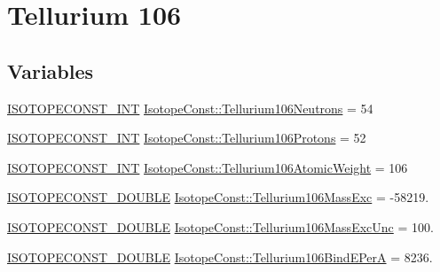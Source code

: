 \hypertarget{group___isotope_const-_tellurium-_te106}{}\section{Tellurium 106}
\label{group___isotope_const-_tellurium-_te106}
\subsection*{Variables}
\begin{DoxyCompactItemize}
\item 
\mbox{\hyperlink{group___isotope_const-_macros_ga5f18360b3e99483a35c32d789e62621c}{I\+S\+O\+T\+O\+P\+E\+C\+O\+N\+S\+T\+\_\+\+I\+NT}} \mbox{\hyperlink{group___isotope_const-_tellurium-_te106_ga340d9bd1e86735c63dcff05eab936361}{Isotope\+Const\+::\+Tellurium106\+Neutrons}} = 54
\item 
\mbox{\hyperlink{group___isotope_const-_macros_ga5f18360b3e99483a35c32d789e62621c}{I\+S\+O\+T\+O\+P\+E\+C\+O\+N\+S\+T\+\_\+\+I\+NT}} \mbox{\hyperlink{group___isotope_const-_tellurium-_te106_gac56c59e9ccc4700f73ad10e5878fe7df}{Isotope\+Const\+::\+Tellurium106\+Protons}} = 52
\item 
\mbox{\hyperlink{group___isotope_const-_macros_ga5f18360b3e99483a35c32d789e62621c}{I\+S\+O\+T\+O\+P\+E\+C\+O\+N\+S\+T\+\_\+\+I\+NT}} \mbox{\hyperlink{group___isotope_const-_tellurium-_te106_ga740865286a13a7ce8c84a46ae1623670}{Isotope\+Const\+::\+Tellurium106\+Atomic\+Weight}} = 106
\item 
\mbox{\hyperlink{group___isotope_const-_macros_ga8f45a7272ce02c0b4c65c44636ed719a}{I\+S\+O\+T\+O\+P\+E\+C\+O\+N\+S\+T\+\_\+\+D\+O\+U\+B\+LE}} \mbox{\hyperlink{group___isotope_const-_tellurium-_te106_gaa2be6aefe1805423473bbc9247507ad5}{Isotope\+Const\+::\+Tellurium106\+Mass\+Exc}} = -\/58219.
\item 
\mbox{\hyperlink{group___isotope_const-_macros_ga8f45a7272ce02c0b4c65c44636ed719a}{I\+S\+O\+T\+O\+P\+E\+C\+O\+N\+S\+T\+\_\+\+D\+O\+U\+B\+LE}} \mbox{\hyperlink{group___isotope_const-_tellurium-_te106_ga1a417dbf61d7e17dea8496dfd1f48153}{Isotope\+Const\+::\+Tellurium106\+Mass\+Exc\+Unc}} = 100.
\item 
\mbox{\hyperlink{group___isotope_const-_macros_ga8f45a7272ce02c0b4c65c44636ed719a}{I\+S\+O\+T\+O\+P\+E\+C\+O\+N\+S\+T\+\_\+\+D\+O\+U\+B\+LE}} \mbox{\hyperlink{group___isotope_const-_tellurium-_te106_ga845c4df31dacd2f75f32762d821015cb}{Isotope\+Const\+::\+Tellurium106\+Bind\+E\+PerA}} = 8236.
\item 

\end{DoxyCompactItemize}
